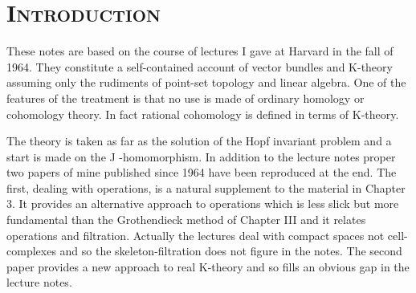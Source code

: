 \chapter*{\scshape Introduction}

These notes are based on the course of lectures I gave at Harvard in the fall of 1964. They constitute a self-contained account of vector bundles and K-theory assuming only the rudiments of point-set topology and linear algebra. One of the features of the treatment is that no use is made of ordinary homology or cohomology theory. In fact rational cohomology is defined in terms of K-theory. \par

The theory is taken as far as the solution of the Hopf invariant problem and a start is made on the J -homomorphism. In addition to the lecture notes proper two papers of mine published since 1964 have been reproduced at the end. The first, dealing with operations, is a natural supplement to the material in Chapter 3. It provides an alternative approach to operations which is less slick but more fundamental than the Grothendieck method of Chapter III and it relates operations and filtration. Actually the lectures deal with compact spaces not cell-complexes and so the skeleton-filtration does not figure in the notes. The second paper provides a new approach to real K-theory and so fills an obvious gap in the lecture notes.
